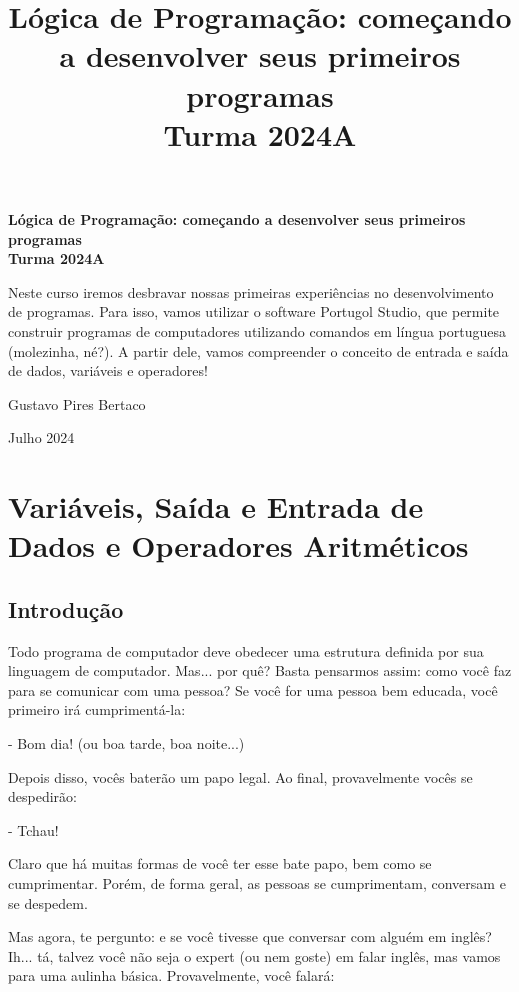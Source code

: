 \documentclass{article}
\title{\textbf{Lógica de Programação: começando a desenvolver seus primeiros programas} \\ Turma 2024A}
\author{}
\date{}
\begin{document}
\begin{titlepage}
    \centering
    \vspace*{4cm}
    {\huge\bfseries Lógica de Programação: começando a desenvolver seus primeiros programas\\ Turma 2024A\par}
    \vspace{2cm}
    \begin{tcolorbox}[colback=blue!5!white, colframe=blue!75!black, title=Descrição do Curso]
        \small Neste curso iremos desbravar nossas primeiras experiências no desenvolvimento de programas. Para isso, vamos utilizar o software Portugol Studio, que permite construir programas de computadores utilizando comandos em língua portuguesa (molezinha, né?). A partir dele, vamos compreender o conceito de entrada e saída de dados, variáveis e operadores!
    \end{tcolorbox}
    \vfill
    {\Large Gustavo Pires Bertaco\par}
    {\large Julho 2024\par}
\end{titlepage}

\newpage

\renewcommand{\contentsname}{Sumário}
\tableofcontents

\newpage

\section{Variáveis, Saída e Entrada de Dados e Operadores Aritméticos}
\subsection{Introdução}
Todo programa de computador deve obedecer uma estrutura definida por sua linguagem de computador. Mas... por quê? Basta pensarmos assim: como você faz para se comunicar com uma pessoa? Se você for uma pessoa bem educada, você primeiro irá cumprimentá-la:

- Bom dia! (ou boa tarde, boa noite...)

Depois disso, vocês baterão um papo legal. Ao final, provavelmente vocês se despedirão:

- Tchau!

Claro que há muitas formas de você ter esse bate papo, bem como se cumprimentar. Porém, de forma geral, as pessoas se cumprimentam, conversam e se despedem.

Mas agora, te pergunto: e se você tivesse que conversar com alguém em inglês? Ih... tá, talvez você não seja o expert (ou nem goste) em falar inglês, mas vamos para uma aulinha básica. Provavelmente, você falará:
\end{document}
